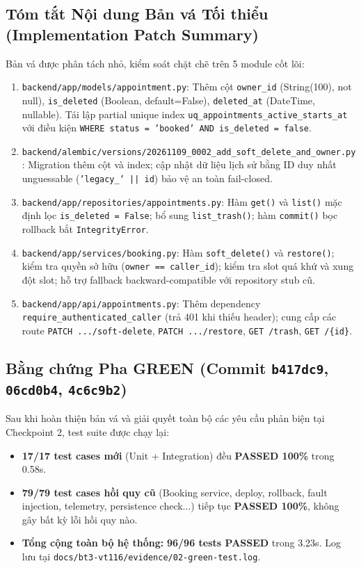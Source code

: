 \documentclass[10pt,a4paper]{article}
\newcommand{\codepath}[1]{{\ttfamily\scriptsize\nolinkurl{#1}}}
\begin{document}
\subsection{Tóm tắt Nội dung Bản vá Tối thiểu (Implementation Patch Summary)}
Bản vá được phân tách nhỏ, kiểm soát chặt chẽ trên 5 module cốt lõi:
\begin{enumerate}[leftmargin=1.1em,itemsep=0.2pt]
  \item \codepath{backend/app/models/appointment.py}: Thêm cột \texttt{owner\_id} (String(100), not null), \texttt{is\_deleted} (Boolean, default=False), \texttt{deleted\_at} (DateTime, nullable). Tái lập partial unique index \texttt{uq\_appointments\_active\_starts\_at} với điều kiện \texttt{WHERE status = 'booked' AND is\_deleted = false}.
  \item \codepath{backend/alembic/versions/20261109_0002_add_soft_delete_and_owner.py}: Migration thêm cột và index; cập nhật dữ liệu lịch sử bằng ID duy nhất unguessable (\texttt{'legacy\_' || id}) bảo vệ an toàn fail-closed.
  \item \codepath{backend/app/repositories/appointments.py}: Hàm \texttt{get()} và \texttt{list()} mặc định lọc \texttt{is\_deleted = False}; bổ sung \texttt{list\_trash()}; hàm \texttt{commit()} bọc rollback bắt \texttt{IntegrityError}.
  \item \codepath{backend/app/services/booking.py}: Hàm \texttt{soft\_delete()} và \texttt{restore()}; kiểm tra quyền sở hữu (\texttt{owner == caller\_id}); kiểm tra slot quá khứ và xung đột slot; hỗ trợ fallback backward-compatible với repository stub cũ.
  \item \codepath{backend/app/api/appointments.py}: Thêm dependency \texttt{require\_authenticated\_caller} (trả 401 khi thiếu header); cung cấp các route \texttt{PATCH .../soft-delete}, \texttt{PATCH .../restore}, \texttt{GET /trash}, \texttt{GET /\{id\}}.
\end{enumerate}

\subsection{Bằng chứng Pha GREEN (Commit \texttt{b417dc9}, \texttt{06cd0b4}, \texttt{4c6c9b2})}
Sau khi hoàn thiện bản vá và giải quyết toàn bộ các yêu cầu phản biện tại Checkpoint 2, test suite được chạy lại:
\begin{itemize}[leftmargin=1.1em,itemsep=0.2pt]
  \item \textbf{17/17 test cases mới} (Unit + Integration) đều \textbf{PASSED 100\%} trong 0.58s.
  \item \textbf{79/79 test cases hồi quy cũ} (Booking service, deploy, rollback, fault injection, telemetry, persistence check...) tiếp tục \textbf{PASSED 100\%}, không gây bất kỳ lỗi hồi quy nào.
  \item \textbf{Tổng cộng toàn bộ hệ thống:} \textbf{96/96 tests PASSED} trong 3.23s. Log lưu tại \codepath{docs/bt3-vt116/evidence/02-green-test.log}.
\end{itemize}
\end{document}
